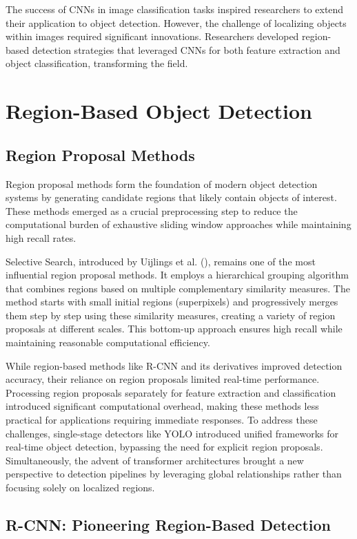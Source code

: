 \documentclass[3p,times]{elsarticle}
\begin{document}
The success of CNNs in image classification tasks inspired researchers to extend their application to object detection. However, the challenge of localizing objects within images required significant innovations. Researchers developed region-based detection strategies that leveraged CNNs for both feature extraction and object classification, transforming the field. 

\section{Region-Based Object Detection}\label{rcnn_section}

\subsection{Region Proposal Methods}
Region proposal methods form the foundation of modern object detection systems by generating candidate regions that likely contain objects of interest. These methods emerged as a crucial preprocessing step to reduce the computational burden of exhaustive sliding window approaches while maintaining high recall rates.

Selective Search, introduced by Uijlings et al. (\cite{Uijlings2013SelectiveSF}), remains one of the most influential region proposal methods. It employs a hierarchical grouping algorithm that combines regions based on multiple complementary similarity measures. The method starts with small initial regions (superpixels) and progressively merges them step by step using these similarity measures, creating a variety of region proposals at different scales. This bottom-up approach ensures high recall while maintaining reasonable computational efficiency.

While region-based methods like R-CNN and its derivatives improved detection accuracy, their reliance on region proposals limited real-time performance. Processing region proposals separately for feature extraction and classification introduced significant computational overhead, making these methods less practical for applications requiring immediate responses. To address these challenges, single-stage detectors like YOLO introduced unified frameworks for real-time object detection, bypassing the need for explicit region proposals. Simultaneously, the advent of transformer architectures brought a new perspective to detection pipelines by leveraging global relationships rather than focusing solely on localized regions. 
\subsection{R-CNN: Pioneering Region-Based Detection}\label{rcnn}
\end{document}

